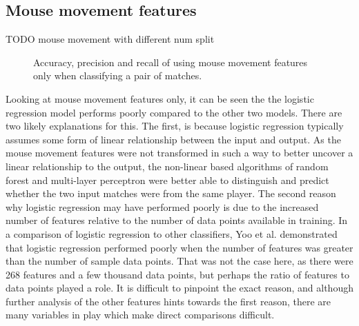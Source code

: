 \documentclass[Report.tex]{subfiles}
\newcommand{\baraxis}[8]{
\begin{axis}[
    ybar,
    title={#1},
    width=#5,
    height=#6,
    ymin=#3, ymax=#4,
    bar width=1em,
    legend style={at={#7},anchor=north,legend columns=-1},
    enlarge x limits=0.4,
    x tick label style={align=center,text width=#8},
    symbolic x coords={Logistic Regression, Random Forest, Multi-layer Perceptron},
    xtick=data,
    ylabel={#2}
]
}
\newcommand{\plotbar}[5]{
\addplot+[
	discard if not={numSplits}{#1},
	discard if not={split}{#2},
	discard if not={features}{#3},
] table [x=model, y=#4,col sep=comma] {data/19-pair-cv.csv};
\addlegendentry{#5}
}
\begin{document}

\subsection{Mouse movement features}

TODO mouse movement with different num split

\begin{figure}[H]
\centering
{}
\caption{Accuracy, precision and recall of using mouse movement features only when classifying a pair of matches.}
\end{figure}

Looking at mouse movement features only, it can be seen the the logistic regression model performs poorly compared to the other two models. There are two likely explanations for this. The first, is because logistic regression typically assumes some form of linear relationship between the input and output. As the mouse movement features were not transformed in such a way to better uncover a linear relationship to the output, the non-linear based algorithms of random forest and multi-layer perceptron were better able to distinguish and predict whether the two input matches were from the same player. The second reason why logistic regression may have performed poorly is due to the increased number of features relative to the number of data points available in training. In a comparison of logistic regression to other classifiers, Yoo et al. \cite{lr-vs-rf} demonstrated that logistic regression performed poorly when the number of features was greater than the number of sample data points. That was not the case here, as there were 268 features and a few thousand data points, but perhaps the ratio of features to data points played a role. It is difficult to pinpoint the exact reason, and although further analysis of the other features hints towards the first reason, there are many variables in play which make direct comparisons difficult. 
\end{document}
